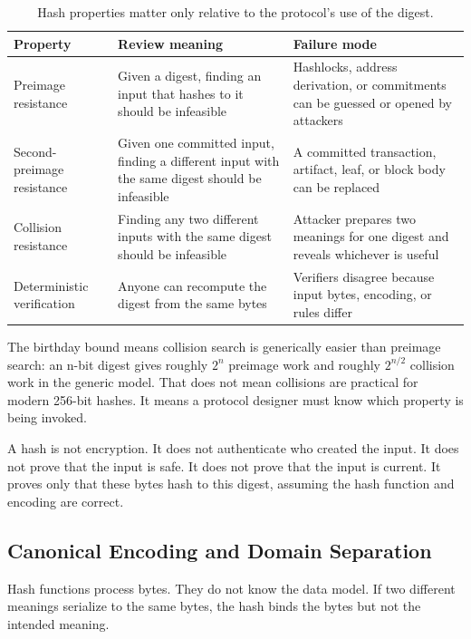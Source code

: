 \begin{table}[htbp]
\centering
\small
\renewcommand{\arraystretch}{1.18}
\begin{tabularx}{\textwidth}{@{}>{\RaggedRight\arraybackslash}p{}>{\RaggedRight\arraybackslash}p{}X@{}}
\toprule
Property & Review meaning & Failure mode \\
\midrule
Preimage resistance & Given a digest, finding an input that hashes to it should be infeasible & Hashlocks, address derivation, or commitments can be guessed or opened by attackers \\
Second-preimage resistance & Given one committed input, finding a different input with the same digest should be infeasible & A committed transaction, artifact, leaf, or block body can be replaced \\
Collision resistance & Finding any two different inputs with the same digest should be infeasible & Attacker prepares two meanings for one digest and reveals whichever is useful \\
Deterministic verification & Anyone can recompute the digest from the same bytes & Verifiers disagree because input bytes, encoding, or rules differ \\
\bottomrule
\end{tabularx}
\caption{Hash properties matter only relative to the protocol's use of the digest.}
\end{table}

The birthday bound means collision search is generically easier than preimage search: an n-bit digest gives roughly \(2^n\) preimage work and roughly \(2^{n/2}\) collision work in the generic model. That does not mean collisions are practical for modern 256-bit hashes. It means a protocol designer must know which property is being invoked.

A hash is not encryption. It does not authenticate who created the input. It does not prove that the input is safe. It does not prove that the input is current. It proves only that these bytes hash to this digest, assuming the hash function and encoding are correct.

\subsection{Canonical Encoding and Domain Separation}

Hash functions process bytes. They do not know the data model. If two different meanings serialize to the same bytes, the hash binds the bytes but not the intended meaning.

